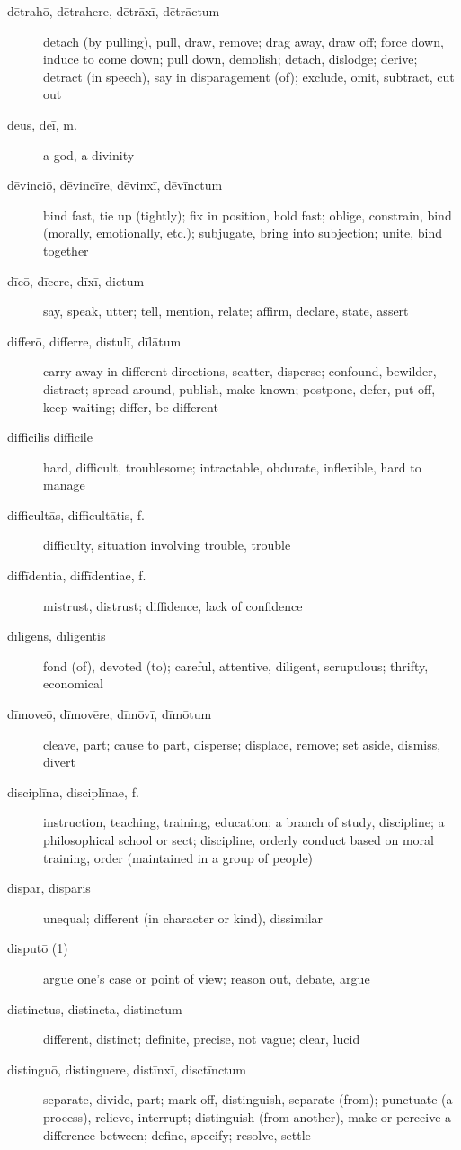 \begin{description}
    \item[dētrahō, dētrahere, dētrāxī, dētrāctum] detach (by pulling), pull, draw, remove; drag away, draw off; force down, induce to come down; pull down, demolish; detach, dislodge; derive; detract (in speech), say in disparagement (of); exclude, omit, subtract, cut out
    \item[deus, deī, m.] a god, a divinity
    \item[dēvinciō, dēvincīre, dēvinxī, dēvīnctum] bind fast, tie up (tightly); fix in position, hold fast; oblige, constrain, bind (morally, emotionally, etc.); subjugate, bring into subjection; unite, bind together
    \item[dīcō, dīcere, dīxī, dictum] say, speak, utter; tell, mention, relate; affirm, declare, state, assert
    \item[differō, differre, distulī, dīlātum] carry away in different directions, scatter, disperse; confound, bewilder, distract; spread around, publish, make known; postpone, defer, put off, keep waiting; differ, be different
    \item[difficilis difficile] hard, difficult, troublesome; intractable, obdurate, inflexible, hard to manage
    \item[difficultās, difficultātis, f.] difficulty, situation involving trouble, trouble
    \item[diffīdentia, diffīdentiae, f.] mistrust, distrust; diffidence, lack of confidence
    \item[dīligēns, dīligentis] fond (of), devoted (to); careful, attentive, diligent, scrupulous; thrifty, economical
    \item[dīmoveō, dīmovēre, dīmōvī, dīmōtum] cleave, part; cause to part, disperse; displace, remove; set aside, dismiss, divert
    \item[disciplīna, disciplīnae, f.] instruction, teaching, training, education; a branch of study, discipline; a philosophical school or sect; discipline, orderly conduct based on moral training, order (maintained in a group of people)
    \item[dispār, disparis] unequal; different (in character or kind), dissimilar
    \item[disputō (1)] argue one's case or point of view; reason out, debate, argue
    \item[distinctus, distincta, distinctum] different, distinct; definite, precise, not vague; clear, lucid
    \item[distinguō, distinguere, distīnxī, disctīnctum] separate, divide, part; mark off, distinguish, separate (from); punctuate (a process), relieve, interrupt; distinguish (from another), make or perceive a difference between; define, specify; resolve, settle

\end{description}
